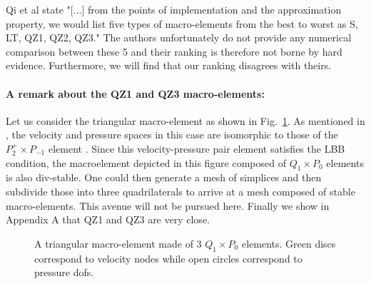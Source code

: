 \documentclass[a4paper,12pt]{article}
\begin{document}
Qi et al \cite{qizh07} state "[...] from the points of implementation and the approximation property, we 
would list five types of macro-elements from the best to worst as S, LT, QZ1, QZ2, QZ3." 
The authors unfortunately do not provide any numerical comparison between these 5 and their 
ranking is therefore not borne by hard evidence. Furthermore, we will find that our ranking disagrees with theirs. 

\paragraph{A remark about the QZ1 and QZ3 macro-elements:}
Let us consider the triangular macro-element as shown in Fig.~\ref{fig:triangle}.
As mentioned in \cite{rovira1992}, 
the velocity and pressure spaces in this case are isomorphic to those
of the $P_2^+ \times P_{-1}$ element \cite{thba25}. Since this velocity-pressure pair 
element satisfies the LBB condition, the macroelement depicted in this figure
composed of $Q_1 \times P_0$ elements is also div-stable.
One could then generate a mesh of simplices and then subdivide those into 
three quadrilaterals to arrive at a mesh composed of stable macro-elements.
This avenue will not be pursued here.
Finally we show in Appendix A that QZ1 and QZ3 are very close.

\begin{figure}
\centering
{}
\caption{A triangular macro-element made of 3 $Q_1\times P_0$ elements.
Green discs correspond to velocity nodes while open circles 
correspond to pressure dofs.}\label{fig:triangle}
\end{figure}

\vspace{.4cm}
\end{document}
